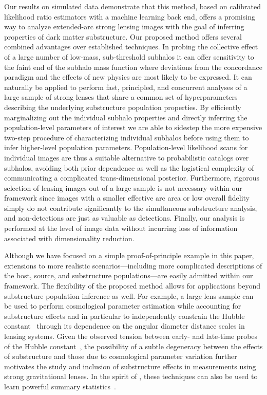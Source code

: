 \documentclass[twocolumn]{aastex63}
\begin{document}
Our results on simulated data demonstrate that this method, based on calibrated likelihood ratio estimators with a machine learning back end, offers a promising way to analyze extended-arc strong lensing images with the goal of inferring properties of dark matter substructure. Our proposed method offers several combined advantages over established techniques. In probing the collective effect of a large number of low-mass, sub-threshold subhalos it can offer sensitivity to the faint end of the subhalo mass function where deviations from the concordance \lcdm paradigm and the effects of new physics are most likely to be expressed. It can naturally be applied to perform fast, principled, and concurrent analyses of a large sample of strong lenses that share a common set of hyperparameters describing the underlying substructure population properties. By efficiently marginalizing out the individual subhalo properties and directly inferring the population-level parameters of interest we are able to sidestep the more expensive two-step procedure of characterizing individual subhalos before using them to infer higher-level population parameters. Population-level likelihood scans for individual images are thus a suitable alternative to probabilistic catalogs over subhalos, avoiding both prior dependence as well as the logistical complexity of communicating a complicated trans-dimensional posterior. Furthermore, rigorous selection of lensing images out of a large sample is not necessary within our framework since images with a smaller effective arc area or low overall fidelity simply do not contribute significantly to the simultaneous substructure analysis, and non-detections are just as valuable as detections. Finally, our analysis is performed at the level of image data without incurring loss of information associated with dimensionality reduction.

Although we have focused on a simple proof-of-principle example in this paper, extensions to more realistic scenarios---including more complicated descriptions of the host, source, and substructure populations---are easily admitted within our framework.  The flexibility of the proposed method allows for applications beyond substructure population inference as well. For example, a large lens sample can be used to perform cosmological parameter estimation while accounting for substructure effects and in particular to independently constrain the Hubble constant~\citep{1907.02533,1907.04869} through its dependence on the angular diameter distance scales in lensing systems. Given the observed tension between early- and late-time probes of the Hubble constant~\citep{1807.06209,1903.07603,1907.04869}, the possibility of a subtle degeneracy between the effects of substructure and those due to cosmological parameter variation further motivates the study and inclusion of substructure effects in measurements using strong gravitational lenses. In the spirit of \citet{Alsing:2017var}, these techniques can also be  used to learn powerful summary statistics~\citep{1805.12244}.
\end{document}
